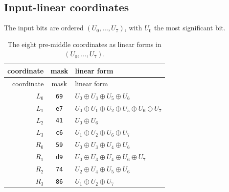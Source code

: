 \subsection{Input-linear coordinates}
The input bits are ordered $(U_0,\ldots,U_7)$, with $U_0$ the most significant bit.
\begin{longtable}{@{}rcl@{}}
\caption{The eight pre-middle coordinates as linear forms in $(U_0,\ldots,U_7)$.}\label{tab:coordinates}\\
\toprule
coordinate & mask & linear form \\
\midrule\endfirsthead
\toprule
coordinate & mask & linear form \\
\midrule\endhead
\bottomrule\endfoot
$L_0$ & \texttt{69} & $U_0\mathbin{\oplus}\allowbreak U_3\mathbin{\oplus}\allowbreak U_5\mathbin{\oplus}\allowbreak U_6$ \\
$L_1$ & \texttt{e7} & $U_0\mathbin{\oplus}\allowbreak U_1\mathbin{\oplus}\allowbreak U_2\mathbin{\oplus}\allowbreak U_5\mathbin{\oplus}\allowbreak U_6\mathbin{\oplus}\allowbreak U_7$ \\
$L_2$ & \texttt{41} & $U_0\mathbin{\oplus}\allowbreak U_6$ \\
$L_3$ & \texttt{c6} & $U_1\mathbin{\oplus}\allowbreak U_2\mathbin{\oplus}\allowbreak U_6\mathbin{\oplus}\allowbreak U_7$ \\
$R_0$ & \texttt{59} & $U_0\mathbin{\oplus}\allowbreak U_3\mathbin{\oplus}\allowbreak U_4\mathbin{\oplus}\allowbreak U_6$ \\
$R_1$ & \texttt{d9} & $U_0\mathbin{\oplus}\allowbreak U_3\mathbin{\oplus}\allowbreak U_4\mathbin{\oplus}\allowbreak U_6\mathbin{\oplus}\allowbreak U_7$ \\
$R_2$ & \texttt{74} & $U_2\mathbin{\oplus}\allowbreak U_4\mathbin{\oplus}\allowbreak U_5\mathbin{\oplus}\allowbreak U_6$ \\
$R_3$ & \texttt{86} & $U_1\mathbin{\oplus}\allowbreak U_2\mathbin{\oplus}\allowbreak U_7$ \\
\end{longtable}

